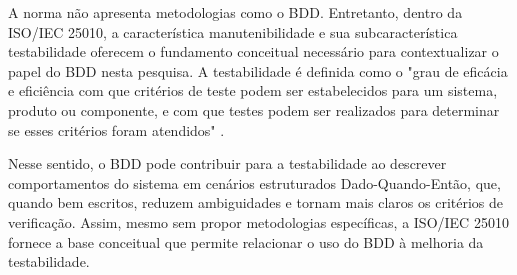 A norma não apresenta metodologias como o BDD. Entretanto, dentro da ISO/IEC 25010, a característica manutenibilidade e sua subcaracterística testabilidade oferecem o fundamento conceitual necessário para contextualizar o papel do BDD nesta pesquisa. A testabilidade é definida como o "grau de eficácia e eficiência com que critérios de teste podem ser estabelecidos para um sistema, produto ou componente, e com que testes podem ser realizados para determinar se esses critérios foram atendidos" \cite[p.~15, tradução nossa]{ISO25010}.

Nesse sentido, o BDD pode contribuir para a testabilidade ao descrever comportamentos do sistema em cenários estruturados Dado-Quando-Então, que, quando bem escritos, reduzem ambiguidades e tornam mais claros os critérios de verificação. Assim, mesmo sem propor metodologias específicas, a ISO/IEC 25010 fornece a base conceitual que permite relacionar o uso do BDD à melhoria da testabilidade. 

